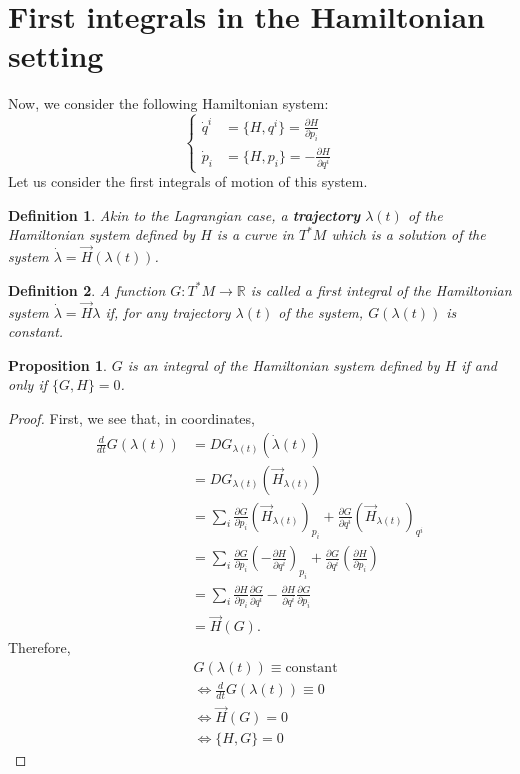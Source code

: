 \documentclass{article}
\newcommand{\R}{\mathbb R}
\newcommand{\pdof}[2]{\frac{\partial #1}{\partial #2}}
\newtheorem{defn}{Definition}
\newtheorem{prop}{Proposition}
\begin{document}
\section{First integrals in the Hamiltonian setting}
Now, we consider the following Hamiltonian system:
\[\left\{\begin{aligned}
    \dot q^i &= \{H,q^i\} = \pdof{H}{p_i} \\
    \dot p_i &= \{H,p_i\} = -\pdof{H}{q^i}
\end{aligned}\right.\]
Let us consider the first integrals of motion of this system.
\begin{defn}
    Akin to the Lagrangian case, a \textbf{trajectory} $\lambda(t)$ of the Hamiltonian system defined by $H$ is a curve in $T^*M$ which is a solution of the system $\dot\lambda = \vec H(\lambda(t))$.
\end{defn}
\begin{defn}
    A function $G:T^*M\to \R$ is called a first integral of the Hamiltonian system $\dot\lambda = \vec{H} \lambda$ if, for any trajectory $\lambda(t)$ of the system, $G(\lambda(t))$ is constant.
\end{defn}    
\begin{prop}
    $G$ is an integral of the Hamiltonian system defined by $H$ if and only if $\{G,H\} = 0$. 
\end{prop}
\begin{proof}
    First, we see that, in coordinates,
    \begin{align*}
        \frac{d}{dt}G(\lambda(t)) &= DG_{\lambda(t)}(\dot\lambda(t))\\
        &= DG_{\lambda(t)}\left(\vec H_{\lambda(t)}\right)\\
        &=\sum_i \pdof{G}{p_i}\left(\vec H_{\lambda(t)}\right)_{p_i} + \pdof{G}{q^i}\left(\vec H_{\lambda(t)}\right)_{q^i}\\
        &=\sum_i \pdof{G}{p_i}\left(-\pdof{H}{q^i}\right)_{p_i} + \pdof{G}{q^i}\left(\pdof{H}{p_i}\right)\\
        &=\sum_i \pdof{H}{p_i}\pdof{G}{q^i} - \pdof{H}{q^i}\pdof{G}{p_i}\\
        &=\vec{H}(G).
    \end{align*}
    Therefore,
    \begin{align*}
            &G(\lambda(t)) \equiv \text{constant}\\
            &\Leftrightarrow \frac{d}{dt}G(\lambda(t))\equiv 0\\
            &\Leftrightarrow \vec{H}(G) = 0\\
            &\Leftrightarrow \{H,G\} = 0
    \end{align*}
\end{proof}
\end{document}
